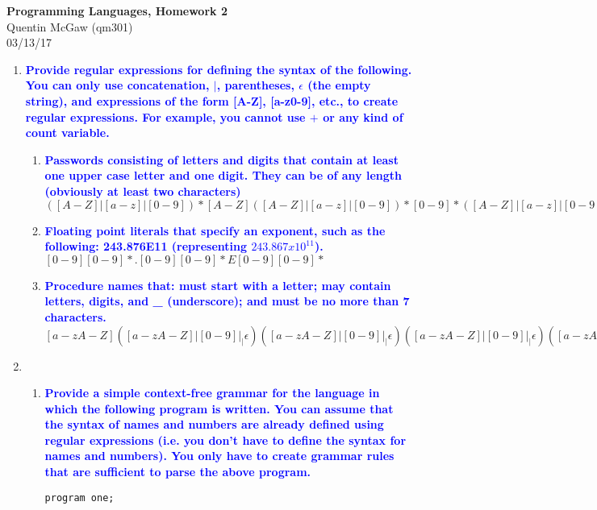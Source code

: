 \documentclass[11pt]{article}
\begin{document}
\begin{center} {\Large\bf Programming Languages, Homework 2}  \\ Quentin McGaw (qm301) \\ 03/13/17
\end{center}

\begin{enumerate}
\item \textbf{\textcolor{blue}{Provide regular expressions for defining the syntax of the following. You can only use concatenation, $|$, parentheses, $\epsilon$ (the empty string), and expressions of the form [A-Z], [a-z0-9], etc., to create regular expressions. For example, you cannot use $+$ or any kind of count variable.}}
    \begin{enumerate}
    \item \textbf{\textcolor{blue}{Passwords consisting of letters and digits that contain at least one upper case letter and one digit. They can be of any length (obviously at least two characters)}}
        \\ $([A-Z]|[a-z]|[0-9])*[A-Z]([A-Z]|[a-z]|[0-9])*[0-9]*([A-Z]|[a-z]|[0-9])*)$
    \item \textbf{\textcolor{blue}{Floating point literals that specify an exponent, such as the following: 243.876E11 (representing $243.867 x 10^{11}$).}}
        \\ $[0-9][0-9]*.[0-9][0-9]*E[0-9][0-9]*$
    \item \textbf{\textcolor{blue}{Procedure names that: must start with a letter; may contain letters, digits, and \_ (underscore); and must be no more than 7 characters.}}
        \\ $[a-zA-Z]([a-zA-Z]|[0-9]|_|\epsilon)([a-zA-Z]|[0-9]|_|\epsilon)([a-zA-Z]|[0-9]|_|\epsilon)([a-zA-Z]|[0-9]|_|\epsilon)([a-zA-Z]|[0-9]|_|\epsilon)([a-zA-Z]|[0-9]|_|\epsilon)$
    \end{enumerate}
\item 
    \begin{enumerate}
    \item \textbf{\textcolor{blue}{Provide a simple context-free grammar for the language in which the following program is written. You can assume that the syntax of names and numbers are already defined using regular expressions (i.e. you don't have to define the syntax for names and numbers). You only have to create grammar rules that are sufficient to parse the above program.}}
    \begin{verbatim}
program one;
    

\end{verbatim}
\end{enumerate}
\end{enumerate}
\end{document}

